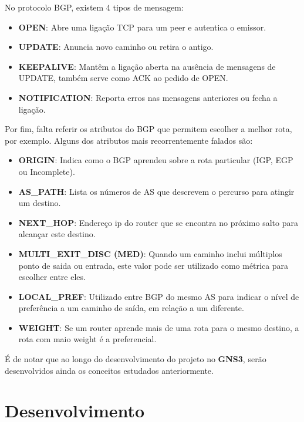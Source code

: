 \documentclass[11pt,english, openright, oneside]{book}
\begin{document}
\begin{itemize}
\begin{itemize}
  No protocolo BGP, existem 4 tipos de mensagem:
  \begin{itemize}
    \item \textbf{OPEN}: Abre uma ligação TCP para um peer e autentica o emissor.
    \item \textbf{UPDATE}: Anuncia novo caminho ou retira o antigo.
    \item \textbf{KEEPALIVE}: Mantêm a ligação aberta na ausência de mensagens de UPDATE, também serve como ACK ao pedido de OPEN.
    \item \textbf{NOTIFICATION}: Reporta erros nas mensagens anteriores ou fecha a ligação.
  \end{itemize}
  \vspace{0.2cm}

  Por fim, falta referir os atributos do BGP que permitem escolher a melhor rota, por exemplo. Alguns dos atributos mais recorrentemente falados são:
  \begin{itemize}
    \item \textbf{ORIGIN}: Indica como o BGP aprendeu sobre a rota particular (IGP, EGP ou Incomplete).
    \item \textbf{AS\_PATH}: Lista os números de AS que descrevem o percurso para atingir um destino.
    \item \textbf{NEXT\_HOP}: Endereço ip do router que se encontra no próximo salto para alcançar este destino.
    \item \textbf{MULTI\_EXIT\_DISC (MED)}: Quando um caminho inclui múltiplos ponto de saida ou entrada, este valor pode ser utilizado como métrica para escolher entre eles.
    \item \textbf{LOCAL\_PREF}: Utilizado entre BGP do mesmo AS para indicar o nível de preferência a um caminho de saída, em relação a um diferente.
    \item \textbf{WEIGHT}: Se um router aprende mais de uma rota para o mesmo destino, a rota com maio weight é a preferencial.
  \end{itemize}
\end{itemize}
\vspace{0.2cm}
\end{itemize}

É de notar que ao longo do desenvolvimento do projeto no \textbf{GNS3}, serão desenvolvidos ainda os conceitos estudados anteriormente.

\pagebreak

\chapter{Desenvolvimento}
\end{document}
